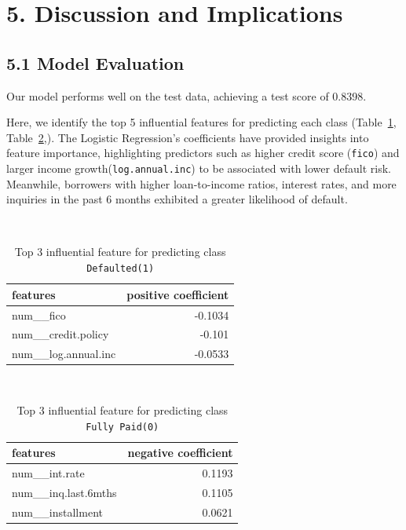 \documentclass[
  letterpaper,
  DIV=11,
  numbers=noendperiod]{scrartcl}
\begin{document}
\newpage

\section{5. Discussion and
Implications}\label{discussion-and-implications}

\subsection{5.1 Model Evaluation}\label{model-evaluation}

Our model performs well on the test data, achieving a test score of
0.8398.

Here, we identify the top 5 influential features for predicting each
class (Table~\ref{tbl-positive_coef}, Table~\ref{tbl-negative_coef},).
The Logistic Regression's coefficients have provided insights into
feature importance, highlighting predictors such as higher credit score
(\texttt{fico}) and larger income growth(\texttt{log.annual.inc}) to be
associated with lower default risk. Meanwhile, borrowers with higher
loan-to-income ratios, interest rates, and more inquiries in the past 6
months exhibited a greater likelihood of default.

~ ~

\begin{longtable}[]{@{}lr@{}}

\caption{\label{tbl-positive_coef}Top 3 influential feature for
predicting class \texttt{Defaulted(1)}}

\tabularnewline

\toprule\noalign{}
features & positive coefficient \\
\midrule\noalign{}
\endhead
\bottomrule\noalign{}
\endlastfoot
num\_\_fico & -0.1034 \\
num\_\_credit.policy & -0.101 \\
num\_\_log.annual.inc & -0.0533 \\

\end{longtable}

~ ~

\begin{longtable}[]{@{}lr@{}}

\caption{\label{tbl-negative_coef}Top 3 influential feature for
predicting class \texttt{Fully\ Paid(0)}}

\tabularnewline

\toprule\noalign{}
features & negative coefficient \\
\midrule\noalign{}
\endhead
\bottomrule\noalign{}
\endlastfoot
num\_\_int.rate & 0.1193 \\
num\_\_inq.last.6mths & 0.1105 \\
num\_\_installment & 0.0621 \\

\end{longtable}
\end{document}
